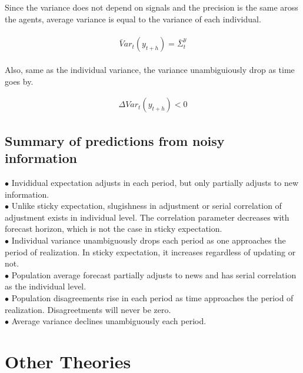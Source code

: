 \documentclass[]{article}
\begin{document}
Since the variance does not depend on signals and the precision is the same aross the agents, average variance is equal to the variance of each individual. 

\begin{eqnarray}
\begin{aligned}
\bar Var_t (y_{t+h}) = \bar \Sigma^y_t
\end{aligned}
\end{eqnarray}

Also, same as the individual variance, the variance unambiguiously drop as time goes by. 

\begin{eqnarray}
\Delta Var_t(y_{t+h}) < 0 
\end{eqnarray}

\subsection{Summary of predictions from noisy information}

$\bullet$  Invididual expectation adjusts in each period, but only partially adjusts to new information. \\
$\bullet$ Unlike sticky expectation, slugishness in adjustment or serial correlation of adjustment exists in individual level. The correlation parameter decreases with forecast horizon, which is not the case in sticky expectation.\\
$\bullet$  Individual variance unambiguously drops each period as one approaches the period of realization. In sticky expectation, it increases regardless of updating or not. \\ 
$\bullet$  Population average forecast partially adjusts to news and has serial correlation as the individual level. \\
$\bullet$  Population disagreements rise in each period as time approaches the period of realization. Disagreetments will never be zero. \\
$\bullet$  Average variance declines unambiguously each period. 


\section{Other Theories}
\end{document}
